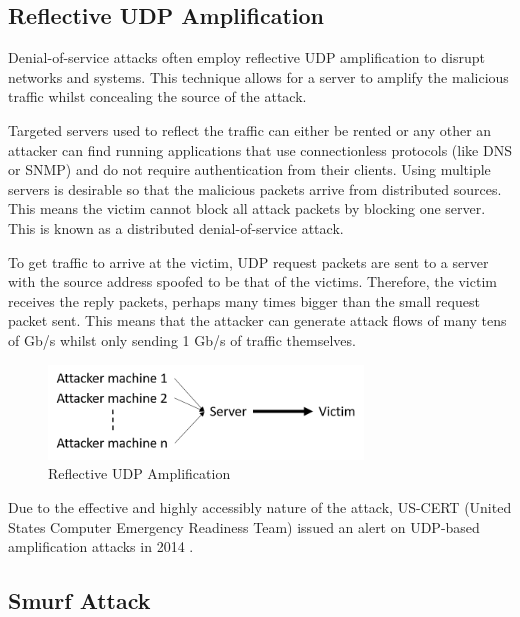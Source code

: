 \documentclass[twocolumn,10pt]{asme2ej}
\begin{document}
\subsection{Reflective UDP Amplification}
Denial-of-service attacks often employ reflective UDP amplification to disrupt networks and systems. This technique allows for a server to amplify the malicious traffic whilst concealing the source of the attack.

Targeted servers used to reflect the traffic can either be rented or any other an attacker can find running applications that use connectionless protocols (like DNS or SNMP) and do not require authentication from their clients. Using multiple servers is desirable so that the malicious packets arrive from distributed sources. This means the victim cannot block all attack packets by blocking one server. This is known as a distributed denial-of-service attack.

To get traffic to arrive at the victim, UDP request packets are sent to a server with the source address spoofed to be that of the victims. Therefore, the victim receives the reply packets, perhaps many times bigger than the small request packet sent. This means that the attacker can generate attack flows of many tens of Gb/s whilst only sending 1 Gb/s of traffic themselves.

\begin{figure}[h]
	\begin{center}
		\includegraphics[width=8.36cm, height=2.52cm]{figures/udp-amplification}
	\end{center}
	\caption{Reflective UDP Amplification}
	\label{figure_amplification} 
\end{figure}

Due to the effective and highly accessibly nature of the attack, US-CERT (United States Computer Emergency Readiness Team) issued an alert on UDP-based amplification attacks in 2014 \cite{USCERT}.
\subsection{Smurf Attack}
\end{document}
